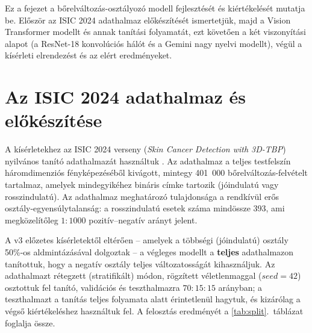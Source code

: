 
Ez a fejezet a bőrelváltozás-osztályozó modell fejlesztését és kiértékelését
mutatja be. Először az ISIC 2024 adathalmaz előkészítését ismertetjük, majd a
Vision Transformer modellt és annak tanítási folyamatát, ezt követően a két
viszonyítási alapot (a ResNet-18 konvolúciós hálót és a Gemini nagy nyelvi
modellt), végül a kísérleti elrendezést és az elért eredményeket.

\section{Az ISIC 2024 adathalmaz és előkészítése}

A kísérletekhez az ISIC 2024 verseny (\textit{Skin Cancer Detection with 3D-TBP})
nyilvános tanító adathalmazát használtuk \cite{isic2024}. Az adathalmaz a teljes
testfelszín háromdimenziós fényképezéséből kivágott, mintegy 401~000
bőrelváltozás-felvételt tartalmaz, amelyek mindegyikéhez bináris címke tartozik
(jó\-indulatú vagy rosszindulatú). Az adathalmaz meghatározó tulajdonsága a
rendkívül erős osztály-egyensúlytalanság: a rosszindulatú esetek száma mindössze
393, ami megközelítőleg $1{:}1000$ pozitív--negatív arányt jelent.

A v3 előzetes kísérletektől eltérően -- amelyek a többségi (jóindulatú) osztály
50\%-os aldmintázásával dolgoztak -- a végleges modellt a \textbf{teljes}
adathalmazon tanítottuk, hogy a negatív osztály teljes változatosságát
kihasználjuk. Az adathalmazt rétegzett (stratifikált) módon, rögzített
véletlenmaggal ($seed = 42$) osztottuk fel tanító, validációs és teszthalmazra
$70{:}15{:}15$ arányban; a teszthalmazt a tanítás teljes folyamata alatt
érintetlenül hagytuk, és kizárólag a végső kiértékeléshez használtuk fel. A
felosztás eredményét a \ref{tab:split}.~táblázat foglalja össze.

